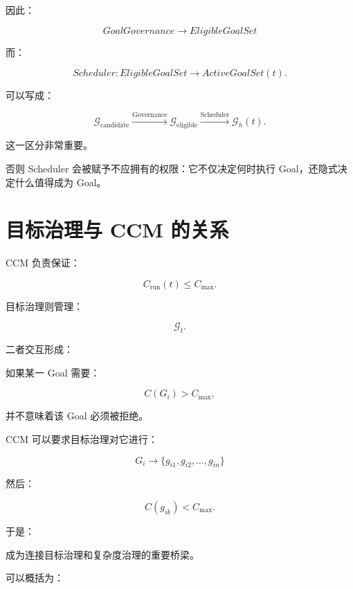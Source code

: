因此：

\[
GoalGovernance
\rightarrow
EligibleGoalSet
\]

而：

\[
Scheduler
:
EligibleGoalSet
\rightarrow
ActiveGoalSet(t).
\]

可以写成：

\[
\mathcal G_{\mathrm{candidate}}
\xrightarrow{\mathrm{Governance}}
\mathcal G_{\mathrm{eligible}}
\xrightarrow{\mathrm{Scheduler}}
\mathcal G_h(t).
\]

这一区分非常重要。

否则 Scheduler 会被赋予不应拥有的权限：它不仅决定何时执行 Goal，还隐式决定什么值得成为 Goal。


\section{目标治理与 CCM 的关系}

CCM 负责保证：

\[
C_{\mathrm{run}}(t)
\le
C_{\max}.
\]

目标治理则管理：

\[
\mathcal G_t.
\]

二者交互形成：

\begin{statementbox}
\centering
{}
\end{statementbox}

如果某一 Goal 需要：

\[
C(G_i)
>
C_{\max},
\]

并不意味着该 Goal 必须被拒绝。

CCM 可以要求目标治理对它进行：

\[
G_i
\rightarrow
\{g_{i1},g_{i2},\dots,g_{in}\}
\]

然后：

\[
C(g_{ik})
<
C_{\max}.
\]

于是：

\begin{statementbox}
\centering
{}
\end{statementbox}

成为连接目标治理和复杂度治理的重要桥梁。

可以概括为：

\begin{statementbox}
\centering
{}
\end{statementbox}


